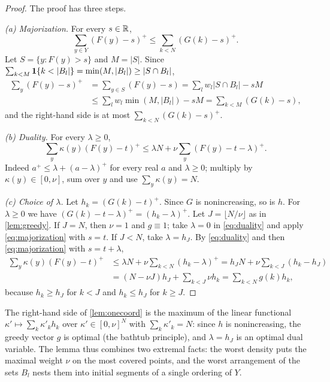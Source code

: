 \begin{proof}
The proof has three steps.

\emph{(a) Majorization.} For every $s\in\mathbb{R}$,
\begin{equation}\label{eq:majorization}
  \sum_{y\in Y}(F(y)-s)^+\le\sum_{k<N}(G(k)-s)^+ .
\end{equation}
Let $S=\{y:F(y)>s\}$ and $M=|S|$. Since $\sum_{k<M}\one\{k<|B_l|\}=\min(M,|B_l|)\ge|S\cap B_l|$,
\begin{align*}
  \sum_y(F(y)-s)^+&=\sum_{y\in S}(F(y)-s)=\sum_lw_l|S\cap B_l|-sM\\
  &\le\sum_lw_l\min(M,|B_l|)-sM=\sum_{k<M}(G(k)-s),
\end{align*}
and the right-hand side is at most $\sum_{k<N}(G(k)-s)^+$.

\emph{(b) Duality.} For every $\lambda\ge0$,
\begin{equation}\label{eq:duality}
  \sum_y\kappa(y)(F(y)-t)^+\le\lambda N+\nu\sum_y(F(y)-t-\lambda)^+ .
\end{equation}
Indeed $a^+\le\lambda+(a-\lambda)^+$ for every real $a$ and $\lambda\ge0$; multiply by $\kappa(y)\in[0,\nu]$, sum
over $y$ and use $\sum_y\kappa(y)=N$.

\emph{(c) Choice of $\lambda$.} Let $h_k=(G(k)-t)^+$. Since $G$ is nonincreasing, so is $h$. For $\lambda\ge0$
we have $(G(k)-t-\lambda)^+=(h_k-\lambda)^+$. Let $J=\lfloor N/\nu\rfloor$ as in \cref{lem:greedy}. If $J=N$, then
$\nu=1$ and $g\equiv1$; take $\lambda=0$ in \eqref{eq:duality} and apply \eqref{eq:majorization} with $s=t$. If
$J<N$, take $\lambda=h_J$. By \eqref{eq:duality} and then \eqref{eq:majorization} with $s=t+\lambda$,
\begin{align*}
  \sum_y\kappa(y)(F(y)-t)^+&\le\lambda N+\nu\sum_{k<N}(h_k-\lambda)^+
  =h_JN+\nu\sum_{k<J}(h_k-h_J)\\
  &=(N-\nu J)h_J+\sum_{k<J}\nu h_k=\sum_{k<N}g(k)h_k,
\end{align*}
because $h_k\ge h_J$ for $k<J$ and $h_k\le h_J$ for $k\ge J$.
\end{proof}

\begin{remark}\label{rem:lp}
The right-hand side of \cref{lem:onecoord} is the maximum of the linear functional
$\kappa'\mapsto\sum_k\kappa'_kh_k$ over $\kappa'\in[0,\nu]^N$ with $\sum_k\kappa'_k=N$: since $h$ is nonincreasing,
the greedy vector $g$ is optimal (the bathtub principle), and $\lambda=h_J$ is an optimal dual variable. The lemma
thus combines two extremal facts: the worst density puts the maximal weight $\nu$ on the most covered points, and
the worst arrangement of the sets $B_l$ nests them into initial segments of a single ordering of $Y$.
\end{remark}

